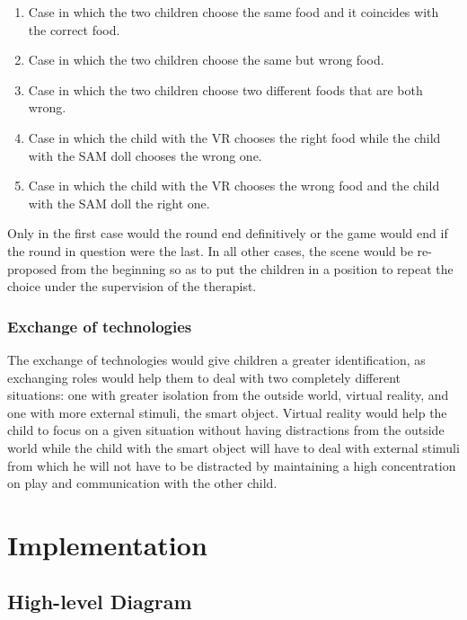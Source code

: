 \documentclass [12pt]{article}
\begin{document}
\begin{enumerate}
\begin{enumerate}
\item Case in which the two children choose the same food and it coincides with the correct food.
\item Case in which the two children choose the same but wrong food.
\item Case in which the two children choose two different foods that are both wrong.
\item Case in which the child with the VR chooses the right food while the child with the SAM doll chooses the wrong one.
\item Case in which the child with the VR chooses the wrong food and the child with the SAM doll the right one.
\end{enumerate}
Only in the first case would the round end definitively or the game would end if the round in question were the last. In all other cases, the scene would be re-proposed from the beginning so as to put the children in a position to repeat the choice under the supervision of the therapist.
\end{enumerate}
\subsubsection{Exchange of technologies}
The exchange of technologies would give children a greater identification, as exchanging roles would help them to deal with two completely different situations: one with greater isolation from the outside world, virtual reality, and one with more external stimuli, the smart object.
Virtual reality would help the child to focus on a given situation without having distractions from the outside world while the child with the smart object will have to deal with external stimuli from which he will not have to be distracted by maintaining a high concentration on play and communication with the other child.
\section{Implementation}
\subsection{High-level Diagram}
\end{document}
